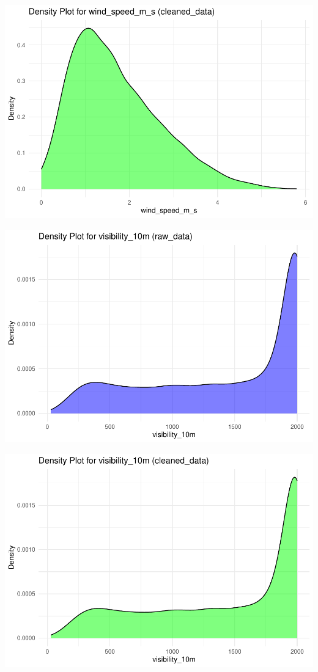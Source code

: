 \documentclass[
  11pt,
  letterpaper,
]{article}
\begin{document}
\begin{center}\includegraphics[width=1.2\linewidth,]{Final_Project_files/figure-latex/unnamed-chunk-15-8} \end{center}

\begin{center}\includegraphics[width=1.2\linewidth,]{Final_Project_files/figure-latex/unnamed-chunk-15-9} \end{center}

\begin{center}\includegraphics[width=1.2\linewidth,]{Final_Project_files/figure-latex/unnamed-chunk-15-10} \end{center}
\end{document}
